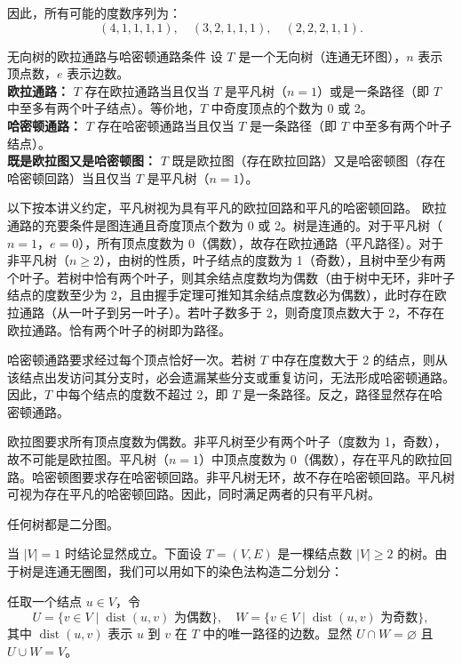 因此，所有可能的度数序列为：
\[
(4,1,1,1,1), \quad (3,2,1,1,1), \quad (2,2,2,1,1).
\]
\begin{theorem}{无向树的欧拉通路与哈密顿通路条件}{}
设 $T$ 是一个无向树（连通无环图），$n$ 表示顶点数，$e$ 表示边数。\\
\textbf{欧拉通路：} $T$ 存在欧拉通路当且仅当 $T$ 是平凡树（$n=1$）或是一条路径（即 $T$ 中至多有两个叶子结点）。等价地，$T$ 中奇度顶点的个数为 0 或 2。\\
\textbf{哈密顿通路：} $T$ 存在哈密顿通路当且仅当 $T$ 是一条路径（即 $T$ 中至多有两个叶子结点）。\\
\textbf{既是欧拉图又是哈密顿图：} $T$ 既是欧拉图（存在欧拉回路）又是哈密顿图（存在哈密顿回路）当且仅当 $T$ 是平凡树（$n=1$）。
\end{theorem}
以下按本讲义约定，平凡树视为具有平凡的欧拉回路和平凡的哈密顿回路。
欧拉通路的充要条件是图连通且奇度顶点个数为 0 或 2。树是连通的。对于平凡树（$n=1$，$e=0$），所有顶点度数为 0（偶数），故存在欧拉通路（平凡路径）。对于非平凡树（$n\ge 2$），由树的性质，叶子结点的度数为 1（奇数），且树中至少有两个叶子。若树中恰有两个叶子，则其余结点度数均为偶数（由于树中无环，非叶子结点的度数至少为 2，且由握手定理可推知其余结点度数必为偶数），此时存在欧拉通路（从一叶子到另一叶子）。若叶子数多于 2，则奇度顶点数大于 2，不存在欧拉通路。恰有两个叶子的树即为路径。

哈密顿通路要求经过每个顶点恰好一次。若树 $T$ 中存在度数大于 2 的结点，则从该结点出发访问其分支时，必会遗漏某些分支或重复访问，无法形成哈密顿通路。因此，$T$ 中每个结点的度数不超过 2，即 $T$ 是一条路径。反之，路径显然存在哈密顿通路。

欧拉图要求所有顶点度数为偶数。非平凡树至少有两个叶子（度数为 1，奇数），故不可能是欧拉图。平凡树（$n=1$）中顶点度数为 0（偶数），存在平凡的欧拉回路。哈密顿图要求存在哈密顿回路。非平凡树无环，故不存在哈密顿回路。平凡树可视为存在平凡的哈密顿回路。因此，同时满足两者的只有平凡树。
\begin{theorem}{}{}
任何树都是二分图。
\end{theorem}
当 \(|V|=1\) 时结论显然成立。下面设 \(T = (V, E)\) 是一棵结点数 \(|V| \ge 2\) 的树。由于树是连通无圈图，我们可以用如下的染色法构造二分划分：

任取一个结点 \(u \in V\)，令
\[
U = \{ v \in V \mid \operatorname{dist}(u, v) \text{ 为偶数} \},
\quad W = \{ v \in V \mid \operatorname{dist}(u, v) \text{ 为奇数} \},
\]
其中 \(\operatorname{dist}(u, v)\) 表示 \(u\) 到 \(v\) 在 \(T\) 中的唯一路径的边数。显然 \(U \cap W = \varnothing\) 且 \(U \cup W = V\)。

